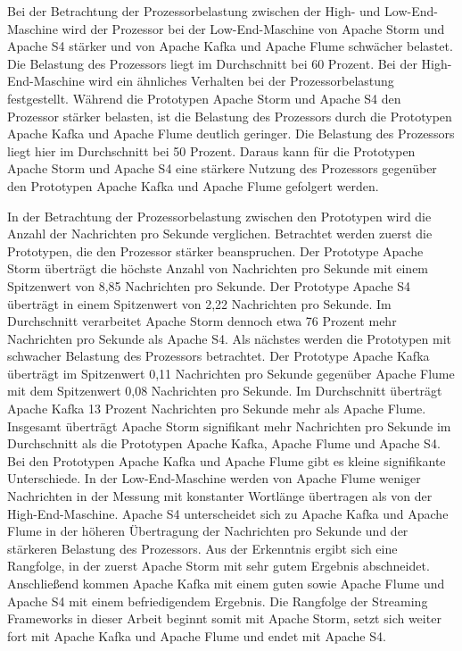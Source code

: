 Bei der Betrachtung der Prozessorbelastung zwischen der High- und Low-End-Maschine wird der Prozessor bei der Low-End-Maschine von Apache Storm und Apache S4 stärker und von Apache Kafka und Apache Flume schwächer belastet. Die Belastung des Prozessors liegt im Durchschnitt bei 60 Prozent. Bei der High-End-Maschine wird ein ähnliches Verhalten bei der Prozessorbelastung festgestellt. Während die Prototypen Apache Storm und Apache S4 den Prozessor stärker belasten, ist die Belastung des Prozessors durch die Prototypen Apache Kafka und Apache Flume deutlich geringer. Die Belastung des Prozessors liegt hier im Durchschnitt bei 50 Prozent. Daraus kann für die Prototypen Apache Storm und Apache S4 eine stärkere Nutzung des Prozessors gegenüber den Prototypen Apache Kafka und Apache Flume gefolgert werden.

In der Betrachtung der Prozessorbelastung zwischen den Prototypen wird die Anzahl der Nachrichten pro Sekunde verglichen. Betrachtet werden zuerst die Prototypen, die den Prozessor stärker beanspruchen. Der Prototype Apache Storm überträgt die höchste Anzahl von Nachrichten pro Sekunde mit einem Spitzenwert von 8,85 Nachrichten pro Sekunde. Der Prototype Apache S4 überträgt in einem Spitzenwert von 2,22 Nachrichten pro Sekunde. Im Durchschnitt verarbeitet Apache Storm dennoch etwa 76 Prozent mehr Nachrichten pro Sekunde als Apache S4. Als nächstes werden die Prototypen mit schwacher Belastung des Prozessors betrachtet. Der Prototype Apache Kafka überträgt im Spitzenwert 0,11 Nachrichten pro Sekunde gegenüber Apache Flume mit dem Spitzenwert 0,08 Nachrichten pro Sekunde. Im Durchschnitt überträgt Apache Kafka 13 Prozent Nachrichten pro Sekunde mehr als Apache Flume. Insgesamt überträgt Apache Storm signifikant mehr Nachrichten pro Sekunde im Durchschnitt als die Prototypen Apache Kafka, Apache Flume und Apache S4. Bei den Prototypen Apache Kafka und Apache Flume gibt es kleine signifikante Unterschiede. In der Low-End-Maschine werden von Apache Flume weniger Nachrichten in der Messung mit konstanter Wortlänge übertragen als von der High-End-Maschine. Apache S4 unterscheidet sich zu Apache Kafka und Apache Flume in der höheren Übertragung der Nachrichten pro Sekunde und der stärkeren Belastung des Prozessors. Aus der Erkenntnis ergibt sich eine Rangfolge, in der zuerst Apache Storm mit sehr gutem Ergebnis abschneidet. Anschließend kommen Apache Kafka mit einem guten sowie Apache Flume und Apache S4 mit einem befriedigendem Ergebnis. Die Rangfolge der Streaming Frameworks in dieser Arbeit beginnt somit mit Apache Storm, setzt sich weiter fort mit Apache Kafka und Apache Flume und endet mit Apache S4.

